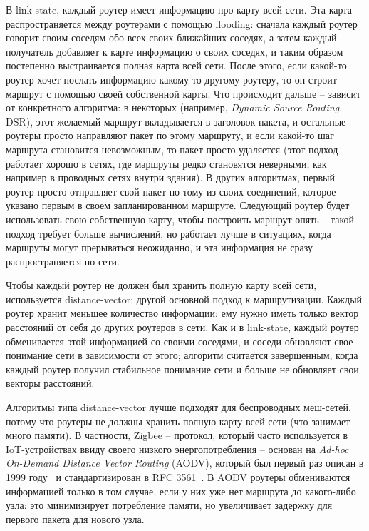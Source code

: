\documentclass[%
]{article}
\begin{document}
В link-state, каждый роутер имеет информацию про карту всей сети.
Эта карта распространяется между роутерами с помощью flooding:
сначала каждый роутер говорит своим соседям обо всех своих ближайших соседях,
а затем каждый получатель добавляет к карте информацию о своих соседях,
и таким образом постепенно выстраивается полная карта всей сети.
После этого, если какой-то роутер хочет послать информацию какому-то другому роутеру,
то он строит маршрут с помощью своей собственной карты.
Что происходит дальше -- зависит от конкретного алгоритма:
в некоторых (например, \emph{Dynamic Source Routing}, DSR), этот желаемый маршрут вкладывается в заголовок пакета,
и остальные роутеры просто направляют пакет по этому маршруту,
и если какой-то шаг маршрута становится невозможным, то пакет просто удаляется
(этот подход работает хорошо в сетях, где маршруты редко становятся неверными,
как например в проводных сетях внутри здания).
В других алгоритмах, первый роутер просто отправляет свой пакет
по тому из своих соединений, которое указано первым в своем запланированном маршруте.
Следующий роутер будет использовать свою собственную карту, чтобы построить маршрут опять -- 
такой подход требует больше вычислений,
но работает лучше в ситуациях, когда маршруты могут прерываться неожиданно,
и эта информация не сразу распространяется по сети.

Чтобы каждый роутер не должен был хранить полную карту всей сети,
используется distance-vector: другой основной подход к маршрутизации.
Каждый роутер хранит меньшее количество информации:
ему нужно иметь только вектор расстояний от себя до других роутеров в сети.
Как и в link-state, каждый роутер обменивается этой информацией со своими соседями,
и соседи обновляют свое понимание сети в зависимости от этого;
алгоритм считается завершенным, когда каждый роутер получил стабильное понимание сети
и больше не обновляет свои векторы расстояний.

Алгоритмы типа distance-vector лучше подходят для беспроводных меш-сетей,
потому что роутеры не должны хранить полную карту всей сети (что занимает много памяти).
В частности, Zigbee -- протокол, который часто используется в IoT-устройствах ввиду своего низкого
энергопотребления --
основан на \emph{Ad-hoc On-Demand Distance Vector Routing} (AODV),
который был первый раз описан в 1999 году~\cite{perkins1999aodv}
и стандартизирован в RFC 3561~\cite{rfc3561}.
В AODV роутеры обмениваются информацией только в том случае,
если у них уже нет маршрута до какого-либо узла:
это минимизирует потребление памяти,
но увеличивает задержку для первого пакета для нового узла.
\end{document}
